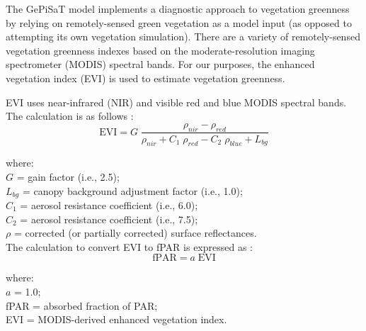 The GePiSaT model implements a diagnostic approach to vegetation greenness by relying on remotely-sensed green vegetation as a model input (as opposed to attempting its own vegetation simulation).  
There are a variety of remotely-sensed vegetation greenness indexes based on the moderate-resolution imaging spectrometer (MODIS) spectral bands.
For our purposes, the enhanced vegetation index (EVI) is used to estimate vegetation greenness.

EVI uses near-infrared (NIR) and visible red and blue MODIS spectral bands.  
The calculation is as follows \parencite[Eq. 2]{huete02}:
\begin{equation}
\label{eq:evi}
    \text{EVI} = G\; \frac{\rho_{nir} - \rho_{red}}{\rho_{nir} + 
                 C_{1}\; \rho_{red} - C_{2}\; \rho_{blue} + L_{bg}}
\end{equation}

\noindent where:\\
\indent $G$ = gain factor (i.e., 2.5);\\
\indent $L_{bg}$ = canopy background adjustment factor (i.e., 1.0);\\
\indent $C_{1}$ = aerosol resistance coefficient (i.e., 6.0);\\
\indent $C_{2}$ = aerosol resistance coefficient (i.e., 7.5);\\
\indent $\rho$ = corrected (or partially corrected) surface reflectances.\\

\noindent The calculation to convert EVI to fPAR is expressed as \parencite[Eq. 11]{xiao05}:
%
\begin{equation}
\label{eq:fapar}
    \text{fPAR} = a\; \text{EVI}
\end{equation}

\noindent where: \\
\indent $a$ = 1.0;\\
\indent fPAR = absorbed fraction of PAR;\\
\indent EVI = MODIS-derived enhanced vegetation index.\\

